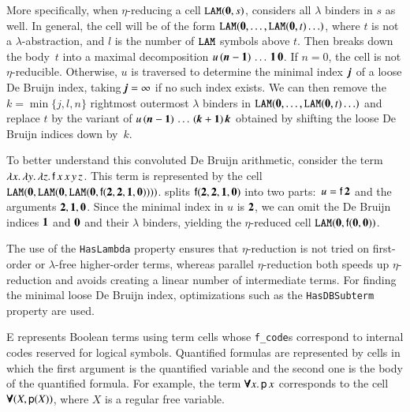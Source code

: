 More specifically, when $\eta$-reducing a cell $\texttt{LAM}(\mathbf{0}, s)$,
\ehohii{} considers all $\lambda$ binders in $s$ as well. In general,
the cell will be of the form
$\texttt{LAM}(\mathbf{0}, \dotsc,\allowbreak \texttt{LAM}(\mathbf{0}, t) \ldots)$,
where $t$ is not a
$\lambda$-abstraction, and $l$ is the number of $\texttt{LAM}$ symbols above $t$. Then \ehohii{} breaks down the body~$t$ into a maximal
decomposition $u\, (\textbf{\textit{n}}\mathbf{{}-1}) \, \ldots \, \mathbf{1} \, \mathbf{0}$.
If $n = 0$, the cell is not $\eta$-reducible.
Otherwise, $u$ is traversed to determine the
minimal index~$\textbf{\textit{j}}$ of a loose De Bruijn index,
taking $\textbf{\textit{j}} = \infty$ if no such index exists.
We can then remove the $k = \min\{j,l,n\}$ rightmost outermost $\lambda$ binders in $\texttt{LAM}(\mathbf{0},
\ldots, \texttt{LAM}(\mathbf{0}, t) \ldots)$ and replace %
$t$ by the variant of
$u \allowbreak\, (\textbf{\textit{n}}\mathbf{{}-1}) \allowbreak\, \ldots \, (\textbf{\textit{k}}\mathbf{{}+1}) \, \textbf{\textit{k}}$
obtained by shifting the loose De Bruijn indices down by~$k$.

To better understand this convoluted De Bruijn arithmetic, consider the
term $\lambda x. \, \lambda y. \, \lambda z.\,\allowbreak \mathsf{f} \, x \, x \, y
\, z$. This term is represented by the cell $\texttt{LAM}(\mathbf{0},
\texttt{LAM}(\mathbf{0}, \texttt{LAM}(\mathbf{0},\allowbreak \mathsf{f}(\mathbf{2}, \mathbf{2}, \mathbf{1},
\mathbf{0}))))$. \ehohii{} splits $\mathsf{f}(\mathbf{2}, \mathbf{2}, \mathbf{1}, \mathbf{0})$ into
two parts:\ $u = \mathsf{f} \, \mathbf{2}$ and the arguments $\mathbf{2}, \mathbf{1},
\mathbf{0}$. Since the minimal index in $u$ is $\mathbf{2}$, we can
omit the De Bruijn indices $\mathbf{1}$ and $\mathbf{0}$ and their $\lambda$ binders,
yielding the $\eta$-reduced cell $\texttt{LAM}(\mathbf{0}, \mathsf{f}(\mathbf{0},
\mathbf{0}))$.

The use of the \texttt{HasLambda} property ensures that $\eta$-reduction is not
tried on first-order or $\lambda$-free higher-order terms, whereas parallel
$\eta$-reduction both speeds up $\eta$-reduction and avoids creating a linear
number of intermediate terms. For finding the minimal loose De Bruijn index,
optimizations such as the \texttt{HasDBSub\-term} property are used.

E represents Boolean terms using
term cells whose \texttt{f\_code}s correspond to internal codes reserved
for logical symbols. Quantified formulas are represented by cells in which the
first argument is the quantified variable and the second one is the body of the
quantified formula. For example, the term $\pmb{\forall} x.\, \mathsf{p} \, x$ corresponds
to the cell $\pmb{\forall}(X, \mathsf{p}(X))$, where $X$ is a regular free variable.

